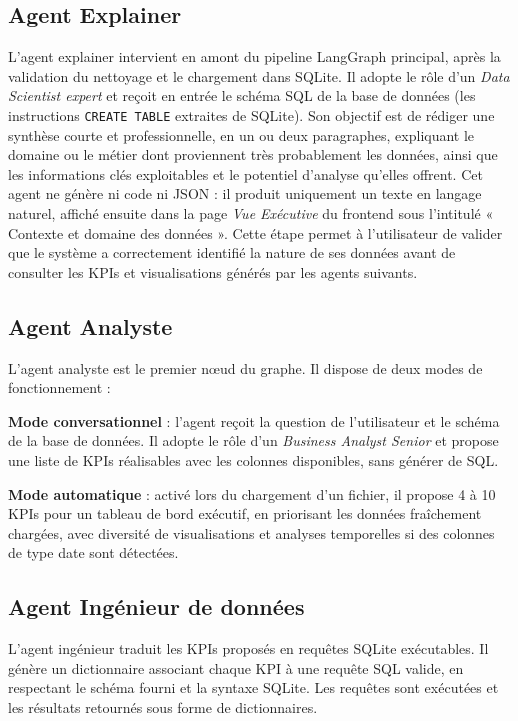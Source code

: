 \subsection{Agent Explainer}
L'agent explainer intervient en amont du pipeline LangGraph principal, après la validation du nettoyage et le chargement dans SQLite. Il adopte le rôle d'un \textit{Data Scientist expert} et reçoit en entrée le schéma SQL de la base de données (les instructions \texttt{CREATE TABLE} extraites de SQLite). Son objectif est de rédiger une synthèse courte et professionnelle, en un ou deux paragraphes, expliquant le domaine ou le métier dont proviennent très probablement les données, ainsi que les informations clés exploitables et le potentiel d'analyse qu'elles offrent.
Cet agent ne génère ni code ni JSON : il produit uniquement un texte en langage naturel, affiché ensuite dans la page \textit{Vue Exécutive} du frontend sous l'intitulé « Contexte et domaine des données ». Cette étape permet à l'utilisateur de valider que le système a correctement identifié la nature de ses données avant de consulter les KPIs et visualisations générés par les agents suivants.

\subsection{Agent Analyste}

L'agent analyste est le premier nœud du graphe. Il dispose de deux modes de fonctionnement :

\textbf{Mode conversationnel} : l'agent reçoit la question de l'utilisateur et le schéma de la base de données. Il adopte le rôle d'un \textit{Business Analyst Senior} et propose une liste de KPIs réalisables avec les colonnes disponibles, sans générer de SQL.

\textbf{Mode automatique} : activé lors du chargement d'un fichier, il propose 4 à 10 KPIs pour un tableau de bord exécutif, en priorisant les données fraîchement chargées, avec diversité de visualisations et analyses temporelles si des colonnes de type date sont détectées.

\subsection{Agent Ingénieur de données}

L'agent ingénieur traduit les KPIs proposés en requêtes SQLite exécutables. Il génère un dictionnaire associant chaque KPI à une requête SQL valide, en respectant le schéma fourni et la syntaxe SQLite. Les requêtes sont exécutées et les résultats retournés sous forme de dictionnaires.

